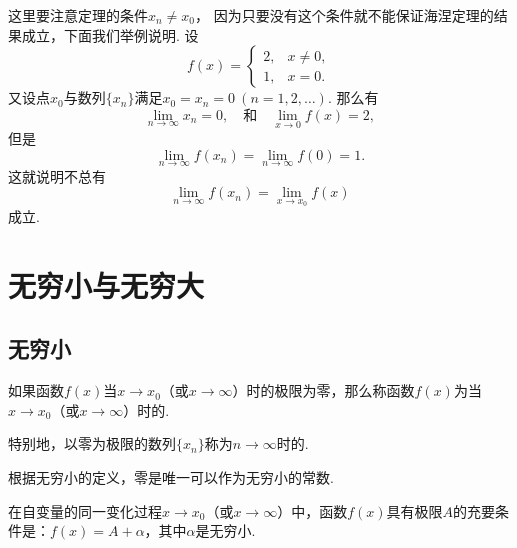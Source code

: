 这里要注意定理的条件\(x_n \neq x_0\)，
因为只要没有这个条件就不能保证海涅定理的结果成立，下面我们举例说明.
设\[
	f(x) = \left\{ \begin{array}{cl}
		2, & x\neq0, \\
		1, & x=0.
	\end{array} \right.
\]
又设点\(x_0\)与数列\(\{x_n\}\)满足\(x_0=x_n=0\ (n=1,2,\dotsc)\).
那么有\[
	\lim\limits_{n\to\infty} x_n = 0,
	\quad\text{和}\quad
	\lim\limits_{x\to0} f(x) = 2,
\]
但是\[
	\lim\limits_{n\to\infty} f(x_n) = \lim\limits_{n\to\infty} f(0) = 1.
\]这就说明不总有\[
	\lim\limits_{n\to\infty} f(x_n)
	= \lim\limits_{x \to x_0} f(x)
\]成立.

\section{无穷小与无穷大}
\subsection{无穷小}
\begin{definition}
如果函数\(f(x)\)当\(x \to x_0\)（或\(x \to \infty\)）时的极限为零，那么称函数\(f(x)\)为当\(x \to x_0\)（或\(x \to \infty\)）时的.

特别地，以零为极限的数列\(\{x_n\}\)称为\(n \to \infty\)时的.
\end{definition}

根据无穷小的定义，零是唯一可以作为无穷小的常数.

\begin{theorem}
在自变量的同一变化过程\(x \to x_0\)（或\(x \to \infty\)）中，函数\(f(x)\)具有极限\(A\)的充要条件是：\(f(x) = A + \alpha\)，其中\(\alpha\)是无穷小.
\end{theorem}

